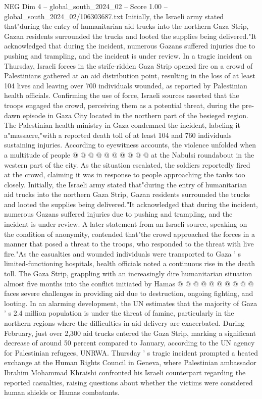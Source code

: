\begin{textsample}{NEG Dim 4 – global\_south\_2024\_02 – Score 1.00 – global\_south\_2024\_02/106303687.txt}  \label{ex:f4_neg_383}
Initially, the Israeli army stated that"during the entry of humanitarian aid trucks into the northern Gaza Strip, Gazan residents surrounded the trucks and looted the supplies being delivered."It acknowledged that during the incident, numerous Gazans suffered injuries due to pushing and trampling, and the incident is under review.
In a tragic incident on Thursday, Israeli forces in the strife-ridden Gaza Strip opened fire on a crowd of Palestinians gathered at an aid distribution point, resulting in the loss of at least 104 lives and leaving over 700 individuals wounded, as reported by Palestinian health officials.
Confirming the use of force, Israeli sources asserted that the troops engaged the crowd, perceiving them as a potential threat, during the pre-dawn episode in Gaza City located in the northern part of the besieged region.
The Palestinian health ministry in Gaza condemned the incident, labeling it a"massacre,"with a reported death toll of at least 104 and 760 individuals sustaining injuries.
According to eyewitness accounts, the violence unfolded when a multitude of people @ @ @ @ @ @ @ @ @ @ at the Nabulsi roundabout in the western part of the city.
As the situation escalated, the soldiers reportedly fired at the crowd, claiming it was in response to people approaching the tanks too closely.
Initially, the Israeli army stated that"during the entry of humanitarian aid trucks into the northern Gaza Strip, Gazan residents surrounded the trucks and looted the supplies being delivered."It acknowledged that during the incident, numerous Gazans suffered injuries due to pushing and trampling, and the incident is under review.
A later statement from an Israeli source, speaking on the condition of anonymity, contended that"the crowd approached the forces in a manner that posed a threat to the troops, who responded to the threat with live fire."As the casualties and wounded individuals were transported to Gaza ' s limited-functioning hospitals, health officials noted a continuous rise in the death toll.
The Gaza Strip, grappling with an increasingly dire humanitarian situation almost five months into the conflict initiated by Hamas @ @ @ @ @ @ @ @ @ @ faces severe challenges in providing aid due to destruction, ongoing fighting, and looting.
In an alarming development, the UN estimates that the majority of Gaza ' s 2.4 million population is under the threat of famine, particularly in the northern regions where the difficulties in aid delivery are exacerbated.
During February, just over 2,300 aid trucks entered the Gaza Strip, marking a significant decrease of around 50 percent compared to January, according to the UN agency for Palestinian refugees, UNRWA.
Thursday ' s tragic incident prompted a heated exchange at the Human Rights Council in Geneva, where Palestinian ambassador Ibrahim Mohammad Khraishi confronted his Israeli counterpart regarding the reported casualties, raising questions about whether the victims were considered human shields or Hamas combatants.

\end{textsample}
